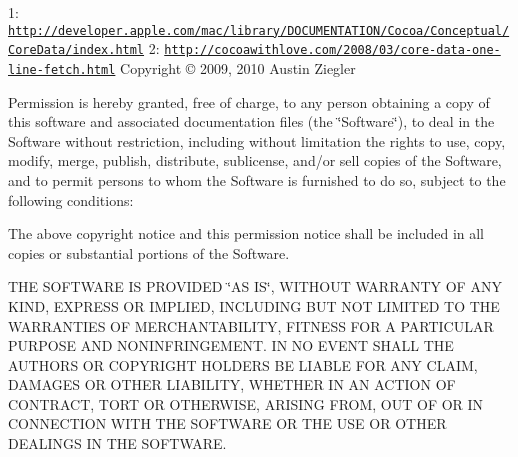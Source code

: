 1\-: \href{http://developer.apple.com/mac/library/DOCUMENTATION/Cocoa/Conceptual/CoreData/index.html}{\tt http\-://developer.\-apple.\-com/mac/library/\-D\-O\-C\-U\-M\-E\-N\-T\-A\-T\-I\-O\-N/\-Cocoa/\-Conceptual/\-Core\-Data/index.\-html} 2\-: \href{http://cocoawithlove.com/2008/03/core-data-one-line-fetch.html}{\tt http\-://cocoawithlove.\-com/2008/03/core-\/data-\/one-\/line-\/fetch.\-html} Copyright \copyright{} 2009, 2010 Austin Ziegler

Permission is hereby granted, free of charge, to any person obtaining a copy of this software and associated documentation files (the \char`\"{}\-Software\char`\"{}), to deal in the Software without restriction, including without limitation the rights to use, copy, modify, merge, publish, distribute, sublicense, and/or sell copies of the Software, and to permit persons to whom the Software is furnished to do so, subject to the following conditions\-:

The above copyright notice and this permission notice shall be included in all copies or substantial portions of the Software.

T\-H\-E S\-O\-F\-T\-W\-A\-R\-E I\-S P\-R\-O\-V\-I\-D\-E\-D \char`\"{}\-A\-S I\-S\char`\"{}, W\-I\-T\-H\-O\-U\-T W\-A\-R\-R\-A\-N\-T\-Y O\-F A\-N\-Y K\-I\-N\-D, E\-X\-P\-R\-E\-S\-S O\-R I\-M\-P\-L\-I\-E\-D, I\-N\-C\-L\-U\-D\-I\-N\-G B\-U\-T N\-O\-T L\-I\-M\-I\-T\-E\-D T\-O T\-H\-E W\-A\-R\-R\-A\-N\-T\-I\-E\-S O\-F M\-E\-R\-C\-H\-A\-N\-T\-A\-B\-I\-L\-I\-T\-Y, F\-I\-T\-N\-E\-S\-S F\-O\-R A P\-A\-R\-T\-I\-C\-U\-L\-A\-R P\-U\-R\-P\-O\-S\-E A\-N\-D N\-O\-N\-I\-N\-F\-R\-I\-N\-G\-E\-M\-E\-N\-T. I\-N N\-O E\-V\-E\-N\-T S\-H\-A\-L\-L T\-H\-E A\-U\-T\-H\-O\-R\-S O\-R C\-O\-P\-Y\-R\-I\-G\-H\-T H\-O\-L\-D\-E\-R\-S B\-E L\-I\-A\-B\-L\-E F\-O\-R A\-N\-Y C\-L\-A\-I\-M, D\-A\-M\-A\-G\-E\-S O\-R O\-T\-H\-E\-R L\-I\-A\-B\-I\-L\-I\-T\-Y, W\-H\-E\-T\-H\-E\-R I\-N A\-N A\-C\-T\-I\-O\-N O\-F C\-O\-N\-T\-R\-A\-C\-T, T\-O\-R\-T O\-R O\-T\-H\-E\-R\-W\-I\-S\-E, A\-R\-I\-S\-I\-N\-G F\-R\-O\-M, O\-U\-T O\-F O\-R I\-N C\-O\-N\-N\-E\-C\-T\-I\-O\-N W\-I\-T\-H T\-H\-E S\-O\-F\-T\-W\-A\-R\-E O\-R T\-H\-E U\-S\-E O\-R O\-T\-H\-E\-R D\-E\-A\-L\-I\-N\-G\-S I\-N T\-H\-E S\-O\-F\-T\-W\-A\-R\-E. 